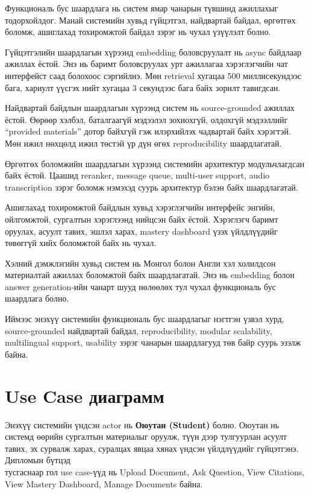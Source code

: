 \documentclass[12pt,A4]{report}
\newcommand{\eng}[1]{#1}
\begin{document}
Функциональ бус шаардлага нь систем ямар чанарын түвшинд ажиллахыг тодорхойлдог. Манай системийн хувьд гүйцэтгэл, найдвартай байдал, өргөтгөх боломж, ашиглахад тохиромжтой байдал зэрэг нь чухал үзүүлэлт болно.

Гүйцэтгэлийн шаардлагын хүрээнд \eng{embedding} боловсруулалт нь \eng{async} байдлаар ажиллах ёстой. Энэ нь баримт боловсруулах урт ажиллагаа хэрэглэгчийн чат интерфейст саад болохоос сэргийлнэ. Мөн retrieval хугацаа 500 миллисекундээс бага, хариулт үүсгэх нийт хугацаа 3 секундээс бага байх зорилт тавигдсан. 

Найдвартай байдлын шаардлагын хүрээнд систем нь source-grounded ажиллах ёстой. Өөрөөр хэлбэл, баталгаагүй мэдээлэл зохиохгүй, олдохгүй мэдээллийг ``provided materials'' дотор байхгүй гэж илэрхийлэх чадвартай байх хэрэгтэй. Мөн ижил нөхцөлд ижил төстэй үр дүн өгөх \eng{reproducibility} шаардлагатай. 

Өргөтгөх боломжийн шаардлагын хүрээнд системийн архитектур модульчлагдсан байх ёстой. Цаашид \eng{reranker}, \eng{message queue}, \eng{multi-user support}, \eng{audio transcription} зэрэг боломж нэмэхэд суурь архитектур бэлэн байх шаардлагатай. 

Ашиглахад тохиромжтой байдлын хувьд хэрэглэгчийн интерфейс энгийн, ойлгомжтой, сургалтын хэрэглээнд нийцсэн байх ёстой. Хэрэглэгч баримт оруулах, асуулт тавих, эшлэл харах, mastery dashboard үзэх үйлдлүүдийг төвөггүй хийх боломжтой байх нь чухал.

Хэлний дэмжлэгийн хувьд систем нь Монгол болон Англи хэл холилдсон материалтай ажиллах боломжтой байх шаардлагатай. Энэ нь embedding болон answer generation-ийн чанарт шууд нөлөөлөх тул чухал функциональ бус шаардлага болно.

Иймээс энэхүү системийн функциональ бус шаардлагыг нэгтгэн үзвэл хурд, source-grounded найдвартай байдал, reproducibility, modular scalability, multilingual support, usability зэрэг чанарын шаардлагууд төв байр суурь эзэлж байна.

\section{Use Case диаграмм}

Энэхүү системийн үндсэн actor нь \textbf{Оюутан (Student)} болно. Оюутан нь системд өөрийн сургалтын материалыг оруулж, түүн дээр тулгуурлан асуулт тавих, эх сурвалж харах, суралцах явцаа хянах үндсэн үйлдлүүдийг гүйцэтгэнэ. Дипломын бүтцэд \\тусгаснаар гол \eng{use case}-үүд нь \eng{Upload Document}, \eng{Ask Question}, \eng{View Citations}, \eng{View Mastery Dashboard}, \eng{Manage Documents} байна. 
\end{document}
